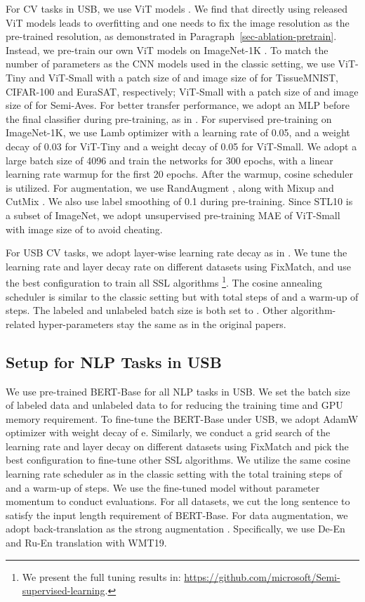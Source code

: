 \documentclass{article}
\begin{document}
For CV tasks in USB, we use ViT models \cite{dosovitskiy2020image}.
We find that directly using released ViT models leads to overfitting and one needs to fix the image resolution as the pre-trained resolution, as demonstrated in Paragraph~\ref{sec-ablation-pretrain}.
Instead, we pre-train our own ViT models on ImageNet-1K \cite{ILSVRC15}.
To match the number of parameters as the CNN models used in the classic setting, we use ViT-Tiny and ViT-Small with a patch size of  and image size of  for TissueMNIST, CIFAR-100 and EuraSAT, respectively; ViT-Small with a patch size of  and image size of  for Semi-Aves. For better transfer performance, we adopt an MLP before the final classifier during pre-training, as in \cite{wang2021revisiting}. For supervised pre-training on ImageNet-1K, we use Lamb optimizer with a learning rate of 0.05, and a weight decay of 0.03 for ViT-Tiny and a weight decay of 0.05 for ViT-Small. We adopt a large batch size of 4096 and train the networks for 300 epochs, with a linear learning rate warmup for the first 20 epochs. After the warmup, cosine scheduler is utilized. For augmentation, we use RandAugment \cite{cubuk2020randaugment}, along with Mixup \cite{zhang2018mixup} and CutMix \cite{yun2019cutmix}. We also use label smoothing of 0.1 during pre-training.  Since STL10 is a subset of ImageNet, we adopt unsupervised pre-training MAE \cite{he2021masked} of ViT-Small with image size of  to avoid cheating. 

For USB CV tasks, we adopt layer-wise learning rate decay as in \cite{liu2021Swin}. We tune the learning rate and layer decay rate on different datasets using FixMatch, and use the best configuration to train all SSL algorithms \footnote{We present the full tuning results in: \url{https://github.com/microsoft/Semi-supervised-learning}.}. The cosine annealing scheduler is similar to the classic setting but with total steps of  and a warm-up of  steps. The labeled and unlabeled batch size is both set to . Other algorithm-related hyper-parameters stay the same as in the original papers. 

\subsection{Setup for NLP Tasks in USB}
We use pre-trained BERT-Base \cite{bert} for all NLP tasks in USB.
We set the batch size of labeled data and unlabeled data to  for reducing the training time and GPU memory requirement.
To fine-tune the BERT-Base under USB, we adopt AdamW optimizer with weight decay of e. Similarly, we conduct a grid search of the learning rate and layer decay on different datasets using FixMatch and pick the best configuration to fine-tune other SSL algorithms.
We utilize the same cosine learning rate scheduler as in the classic setting with the total training steps of  and a warm-up of  steps.
We use the fine-tuned model without parameter momentum to conduct evaluations.
For all datasets, we cut the long sentence to satisfy the input length requirement of BERT-Base. For data augmentation, we adopt back-translation as the strong augmentation \cite{xie2020unsupervised, chen2020mixtext}. Specifically, we use De-En and Ru-En translation with WMT19.
\end{document}
